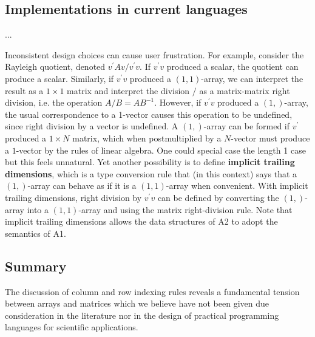 \subsection{Implementations in current languages}


...

Inconsistent design choices can cause user frustration. For example,
consider the Rayleigh quotient, denoted $v^{\prime}Av/v^{\prime}v$.
If $v^{\prime}v$ produced a scalar, the quotient can produce a scalar.
Similarly, if $v^{\prime}v$ produced a $\left(1,1\right)$-array,
we can interpret the result as a $1\times1$ matrix and interpret
the division $/$ as a matrix-matrix right division, i.e. the operation
$A/B=AB^{-1}$. However, if $v^{\prime}v$ produced a $\left(1,\right)$-array,
the usual correspondence to a 1-vector causes this operation to be
undefined, since right division by a vector is undefined. A $(1,)$-array
can be formed if $v^{\prime}$ produced a $1\times N$ matrix, which
when postmultiplied by a $N$-vector must produce a $1$-vector by
the rules of linear algebra. One could special case the length 1 case
but this feels unnatural. Yet another possibility is to define \textbf{implicit
trailing dimensions}, which is a type conversion rule that (in this
context) says that a $(1,)$-array can behave as if it is a $(1,1)$-array
when convenient. With implicit trailing dimensions, right division
by $v^{\prime}v$ can be defined by converting the $(1,)$-array into
a $(1,1)$-array and using the matrix right-division rule. Note that
implicit trailing dimensions allows the data structures of A2 to adopt
the semantics of A1.




\subsection{Summary}

The discussion of column and row indexing rules reveals a fundamental tension
between arrays and matrices which we believe have not been given due
consideration in the literature nor in the design of practical programming
languages for scientific applications.

